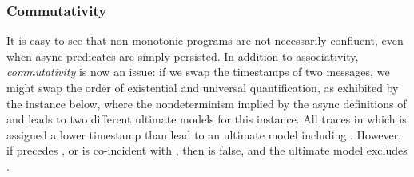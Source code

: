 



\subsubsection{Commutativity}

It is easy to see that non-monotonic programs are not necessarily confluent,
even when async predicates are simply persisted.  In addition to associativity,
{\em commutativity} is now an issue: if we swap the timestamps of two messages,
we might swap the order of existential and universal quantification, as
exhibited by the instance below, where the 
nondeterminism implied by the async definitions of  and 
leads to two different ultimate models for this instance.  All traces in which
 is assigned a lower timestamp than  lead to an ultimate
model including .  However, if  precedes
, or is co-incident with , then 
is false, and the ultimate model excludes .

